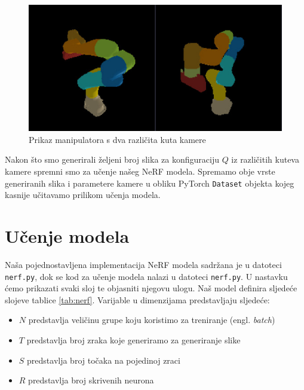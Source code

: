 \documentclass[times, utf8, diplomskirad]{fer}
\begin{document}
\begin{figure}[H]
    \centering
    \includegraphics[width=15cm]{img/different-angles-manipulator}
    \caption{Prikaz manipulatora s dva različita kuta kamere}
    \label{fig:manipulator-2-kamere}
\end{figure}
Nakon što smo generirali željeni broj slika za konfiguraciju $Q$ iz različitih kuteva kamere spremni smo za učenje našeg NeRF modela.
Spremamo obje vrste generiranih slika i parametere kamere u obliku PyTorch \texttt{Dataset} objekta kojeg kasnije učitavamo prilikom učenja modela.

\section{Učenje modela}
Naša pojednostavljena implementacija NeRF modela sadržana je u datoteci \texttt{nerf.py}, dok se kod za učenje modela nalazi u datoteci \texttt{nerf.py}.
U nastavku ćemo prikazati svaki sloj te objasniti njegovu ulogu.
Naš model definira sljedeće slojeve tablice \ref{tab:nerf}.
Varijable u dimenzijama predstavljaju sljedeće:
\begin{itemize}
    \item $N$ predstavlja veličinu grupe koju koristimo za treniranje (engl. \textit{batch})
    \item $T$ predstavlja broj zraka koje generiramo za generiranje slike
    \item $S$ predstavlja broj točaka na pojedinoj zraci
    \item $R$ predstavlja broj skrivenih neurona
\end{itemize}
\end{document}
